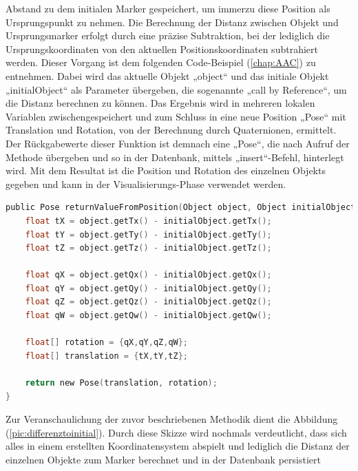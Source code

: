 Abstand zu dem initialen Marker gespeichert, um immerzu diese Position als Ursprungspunkt zu nehmen. Die Berechnung der Distanz zwischen Objekt und 
Ursprungsmarker erfolgt durch eine präzise Subtraktion, bei der lediglich die Ursprungskoordinaten von den aktuellen Positionskoordinaten subtrahiert werden. 
Dieser Vorgang ist dem folgenden Code-Beispiel (\ref{chap:AAC}) zu entnehmen. Dabei wird das aktuelle Objekt „object“ und das initiale Objekt „initialObject“ 
als Parameter übergeben, die sogenannte „call by Reference“, um die Distanz berechnen zu können. Das Ergebnis wird in mehreren lokalen Variablen 
zwischengespeichert und zum Schluss in eine neue Position „Pose“ mit Translation und Rotation, von der Berechnung durch Quaternionen, ermittelt. Der Rückgabewerte 
dieser Funktion ist demnach eine „Pose“, die nach Aufruf der Methode übergeben und so in der Datenbank, mittels „insert“-Befehl, hinterlegt wird. Mit dem 
Resultat ist die Position und Rotation des einzelnen Objekts gegeben und kann in der Visualisierungs-Phase verwendet werden.
\\
\linebreak
\begin{lstlisting}[language=C,
    frame=lines,           % Ein Rahmen um den Code (single for box, lines for top and bottom)
    xleftmargin=\parindent,  % Rahmen link von den Zahlen
    style=algoBericht,
    label={code:differencetoinitial},
    captionpos=b,           % Caption unter den Code setzen
caption={Berechnung der Distanz zwischen Marker und Ursprungspunkt}]
public Pose returnValueFromPosition(Object object, Object initialObject){
    float tX = object.getTx() - initialObject.getTx();
    float tY = object.getTy() - initialObject.getTy();
    float tZ = object.getTz() - initialObject.getTz();

    float qX = object.getQx() - initialObject.getQx();
    float qY = object.getQy() - initialObject.getQy();
    float qZ = object.getQz() - initialObject.getQz();
    float qW = object.getQw() - initialObject.getQw();

    float[] rotation = {qX,qY,qZ,qW};
    float[] translation = {tX,tY,tZ};

    return new Pose(translation, rotation);
}
\end{lstlisting}
Zur Veranschaulichung der zuvor beschriebenen Methodik dient die Abbildung (\ref{pic:differenztoinitial}). Durch diese Skizze wird nochmals verdeutlicht, dass 
sich alles in einem erstellten Koordinatensystem abspielt und lediglich die Distanz der einzelnen Objekte zum Marker berechnet und in der Datenbank persistiert 
